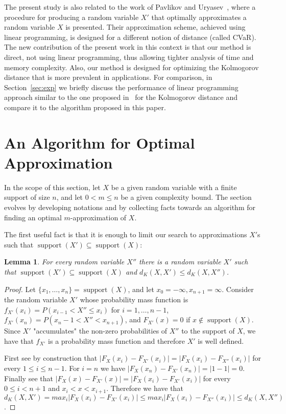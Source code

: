 \documentclass{article}
\newtheorem{lemma}[thm]{Lemma}
\DeclareMathOperator{\support}{support}
\begin{document}
The present study is also related to the work of Pavlikov and Uryasev~\cite{pavlikov2016cvar}, where a procedure for producing a random variable $X'$ that optimally approximates a random variable $X$ is presented. Their approximation scheme, achieved using linear programming, is designed for a different notion of distance (called CVaR). The new contribution of the present work in this context is that our method is direct, not using linear programming, thus allowing tighter analysis of time and memory complexity. Also, our method is designed for optimizing the Kolmogorov distance that is more prevalent in applications. For comparison, in Section~\ref{sec:exp} we briefly discuss the performance of linear programming approach similar to the one proposed in~\cite{pavlikov2016cvar} for the Kolmogorov distance and compare it to the algorithm proposed in this paper. 

\section{An Algorithm for Optimal Approximation}\label{sec:alg}
In the scope of this section, let $X$ be a given random variable with a finite support of size $n$, and let  $0<m\leq n$ be a given complexity bound. The section evolves by developing notations and by collecting facts towards an algorithm for finding an optimal $m$-approximation of $X$.

The first useful fact is that it is enough to limit our search to approximations $X'$s such that $\support(X') \subseteq \support(X)$:

\begin{lemma}\label{lem:supContained}
	For every random variable $X''$ there is a random variable $X'$ such that $\support(X') \subseteq \support(X)$ and $d_{K}(X,X')\leq d_{K}(X,X'')$.
\end{lemma}

\begin{proof}
	Let $\{x_1,\dots,x_n\} = \support(X)$, and let $x_0 = -\infty, x_{n+1}=\infty$. Consider the random variable $X'$ whose probability mass function is
	$f_{X'}(x_i) = P(x_{i-1} < X'' \leq x_i)$ for $i=1,\dots,n-1$,  $f_{X'}(x_n) = P(x_n-1 < X'' < x_{n+1})$, and $F_{X'}(x)=0$ if $x\notin \support(X)$.  Since $X'$ "accumulates" the non-zero probabilities of $X''$ to the support of $X$, we have that $f_{X'}$ is a probability mass function and therefore $X'$ is well defined.
	
	First see by construction that $|F_{X}(x_i)-F_{X'}(x_i)| = |F_{X}(x_i)-F_{X''}(x_i)|$ for every  $1\leq i\leq n-1$. For $i=n$ we have $|F_{X}(x_n)-F_{X'}(x_n)| = |1-1|=0$.
	Finally see that   $|F_{X}(x)-F_{X'}(x)| = |F_{X}(x_i)-F_{X'}(x_i)|$ for every  $0\leq   i < n+1$  and $x_i<x<x_{i+1}$. Therefore we have that $d_K(X,X')=max_{i}|F_{X}(x_i)-F_{X'}(x_i)|\leq max_{i}|F_{X}(x_i)-F_{X''}(x_i)|\leq d_K(X,X'')$.
\end{proof}
\end{document}
